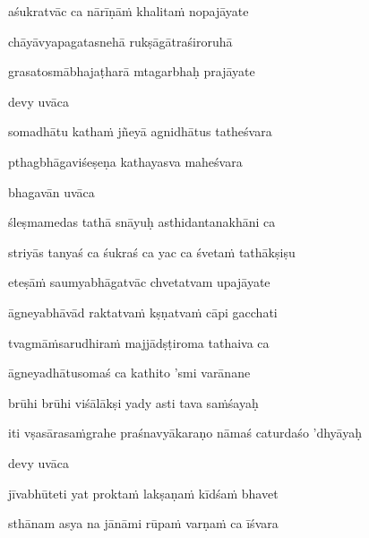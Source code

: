aśukratvāc ca nārīṇā\.m khalita\.m nopajāyate\thinspace{\dandab} \dontdisplaylinenum

chāyāvyapagatasnehā rukṣāgātraśiroruhā \danda\dontdisplaylinenum

grasatosmābhajaṭharā mtagarbhaḥ prajāyate \veg\dontdisplaylinenum

devy uvāca~{\dandab}\dontdisplaylinenum 

somadhātu katha\.m jñeyā agnidhātus tatheśvara\thinspace{\danda} \dontdisplaylinenum

pthagbhāgaviśeṣeṇa kathayasva maheśvara \veg\dontdisplaylinenum

bhagavān uvāca~{\dandab}\dontdisplaylinenum 

śleṣmamedas tathā snāyuḥ asthidantanakhāni ca\thinspace{\danda} \dontdisplaylinenum

striyās tanyaś ca śukraś ca yac ca śveta\.m tathākṣiṣu \veg\dontdisplaylinenum

eteṣā\.m saumyabhāgatvāc chvetatvam upajāyate\thinspace{\dandab} \dontdisplaylinenum

āgneyabhāvād raktatva\.m kṣṇatva\.m cāpi gacchati \veg\dontdisplaylinenum

tvagmā\.msarudhira\.m majjādṣṭiroma tathaiva ca\thinspace{\dandab} \dontdisplaylinenum

āgneyadhātusomaś ca kathito 'smi varānane \danda\dontdisplaylinenum

brūhi brūhi viśālākṣi yady asti tava sa\.mśayaḥ \veg\dontdisplaylinenum


\jump
\begin{center}
\ketdanda iti vṣasārasa\.mgrahe praśnavyākaraṇo nāmaś caturdaśo 'dhyāyaḥ\ketdanda
\end{center}
\dontdisplaylinenum\vers 
\bekveg\szamveg\vfill\phpspagebreak\szam\bek{}
\thispagestyle{empty}



\jump\jump

devy uvāca~{\dandab}\dontdisplaylinenum 

jīvabhūteti yat prokta\.m lakṣaṇa\.m kīdśa\.m bhavet\thinspace{\danda} \dontdisplaylinenum

sthānam asya na jānāmi rūpa\.m varṇa\.m ca īśvara \veg\dontdisplaylinenum

